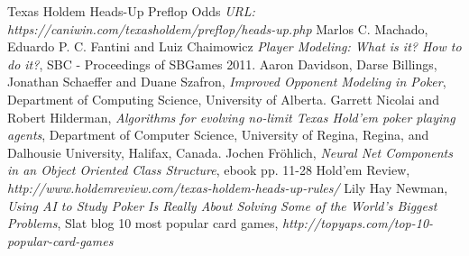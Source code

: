 \begin{thebibliography}{100} 
 Texas Holdem Heads-Up Preflop Odds 
\emph{URL: https://caniwin.com/texasholdem/preflop/heads-up.php}
 Marlos C. Machado, Eduardo P. C. Fantini and Luiz Chaimowicz \emph{Player Modeling: What is it? How to do it?}, SBC - Proceedings of SBGames 2011.
 Aaron Davidson, Darse Billings, Jonathan Schaeffer and Duane Szafron, \emph{Improved Opponent Modeling in Poker},
Department of Computing Science, University of Alberta.
 Garrett Nicolai and Robert Hilderman, \emph{Algorithms for evolving no-limit Texas Hold'em poker playing agents}, Department of Computer Science, University of Regina, Regina, and Dalhousie University, Halifax, Canada.
 Jochen Fröhlich, \emph {Neural Net Components in an Object Oriented Class Structure}, 
ebook pp. 11-28
 Hold'em Review, \emph {http://www.holdemreview.com/texas-holdem-heads-up-rules/}
 Lily Hay Newman, \emph{Using AI to Study Poker Is Really About Solving Some of the World’s Biggest Problems}, 
Slat blog
\bibitem {}
 10 most popular card games, \emph {http://topyaps.com/top-10-popular-card-games}
\end{thebibliography}